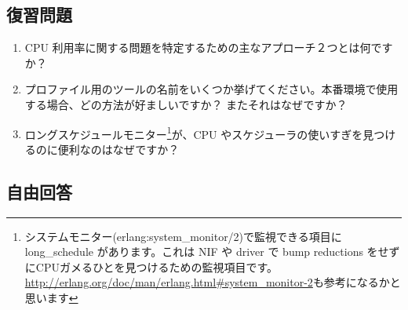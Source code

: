 \subsection*{復習問題}

\begin{enumerate}
	\item CPU 利用率に関する問題を特定するための主なアプローチ２つとは何ですか？
	\item プロファイル用のツールの名前をいくつか挙げてください。本番環境で使用する場合、どの方法が好ましいですか？ またそれはなぜですか？
  \item ロングスケジュールモニター\footnote{システムモニター(erlang:system\_monitor/2)で監視できる項目に long\_schedule があります。これは NIF や driver で bump reductions をせずにCPUガメるひとを見つけるための監視項目です。\href{http://erlang.org/doc/man/erlang.html\#system\_monitor-2}{http://erlang.org/doc/man/erlang.html\#system\_monitor-2}も参考になるかと思います}が、CPU やスケジューラの使いすぎを見つけるのに便利なのはなぜですか？

\end{enumerate}

\subsection*{自由回答}

